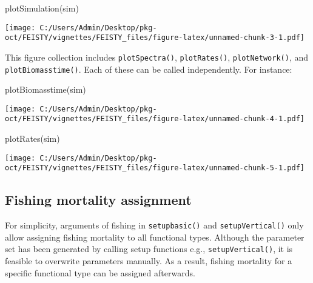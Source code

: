 \documentclass[
]{article}
\newenvironment{Shaded}{\begin{snugshade}}{\end{snugshade}}
\newcommand{\FunctionTok}[1]{\textcolor[rgb]{0.00,0.00,0.00}{#1}}
\newcommand{\NormalTok}[1]{#1}
\begin{document}
\begin{Shaded}
\begin{Highlighting}[]
\FunctionTok{plotSimulation}\NormalTok{(sim)}
\end{Highlighting}
\end{Shaded}

\texttt{[image: C:/Users/Admin/Desktop/pkg-oct/FEISTY/vignettes/FEISTY\_files/figure-latex/unnamed-chunk-3-1.pdf]}

This figure collection includes \texttt{plotSpectra()},
\texttt{plotRates()}, \texttt{plotNetwork()}, and
\texttt{plotBiomasstime()}. Each of these can be called independently.
For instance:

\begin{Shaded}
\begin{Highlighting}[]
\FunctionTok{plotBiomasstime}\NormalTok{(sim)}
\end{Highlighting}
\end{Shaded}

\texttt{[image: C:/Users/Admin/Desktop/pkg-oct/FEISTY/vignettes/FEISTY\_files/figure-latex/unnamed-chunk-4-1.pdf]}

\begin{Shaded}
\begin{Highlighting}[]
\FunctionTok{plotRates}\NormalTok{(sim)}
\end{Highlighting}
\end{Shaded}

\texttt{[image: C:/Users/Admin/Desktop/pkg-oct/FEISTY/vignettes/FEISTY\_files/figure-latex/unnamed-chunk-5-1.pdf]}

\hypertarget{fishing-mortality-assignment}{%
\subsection{Fishing mortality
assignment}\label{fishing-mortality-assignment}}

For simplicity, arguments of fishing in \texttt{setupbasic()} and
\texttt{setupVertical()} only allow assigning fishing mortality to all
functional types. Although the parameter set has been generated by
calling setup functions e.g., \texttt{setupVertical()}, it is feasible
to overwrite parameters manually. As a result, fishing mortality for a
specific functional type can be assigned afterwards.
\end{document}
